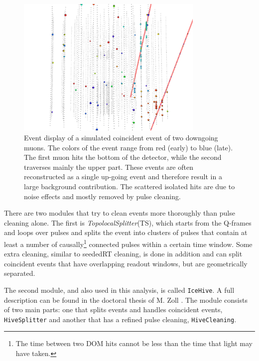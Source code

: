 \begin{figure}[t]
\centering
\includegraphics[width=0.8\textwidth]{chapter7/img/coincidenteventsCORS.png}
\caption{Event display of a simulated coincident event of two downgoing muons. The colors of the event range from red (early) to blue (late). The first muon hits the bottom of the detector, while the second traverses mainly the upper part. These events are often reconstructed as a single up-going event and therefore result in a large background contribution. The scattered isolated hits are due to noise effects and mostly removed by pulse cleaning.}
\label{fig:coincidentevent}
\end{figure}

\noindent There are two modules that try to clean events more thoroughly than pulse cleaning alone. The first is \textit{TopolocalSplitter}(TS), which starts from the Q-frames and loops over pulses and splits the event into clusters of pulses that contain at least a number of causally\footnote{The time between two DOM hits cannot be less than the time that light may have taken.} connected pulses within a certain time window. Some extra cleaning, similar to seededRT cleaning, is done in addition and can split coincident events that have overlapping readout windows, but are geometrically separated.

The second module, and also used in this analysis, is called \texttt{IceHive}. A full description can be found in the doctoral thesis of M. Zoll \cite{mzollthesis}. The module consists of two main parts: one that splits events and handles coincident events, \texttt{HiveSplitter} and another that has a refined pulse cleaning, \texttt{HiveCleaning}.


